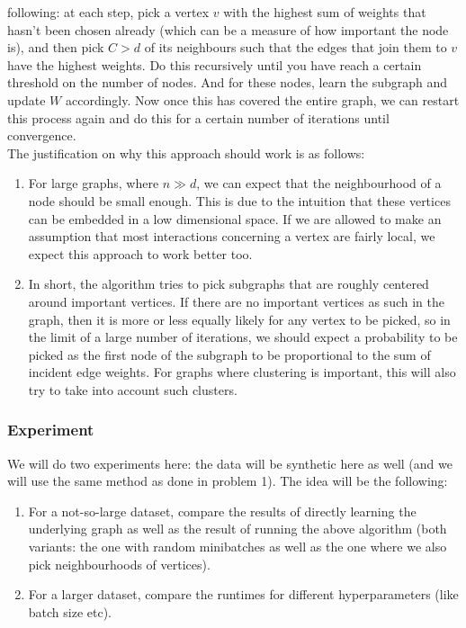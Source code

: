 \documentclass[a4paper]{article}
\newcommand{\nl}{\vspace{0.2cm}\\}
\begin{document}
following: at each step, pick a vertex $v$ with the highest sum of weights that hasn't been chosen already (which can be a measure of how important the node is), and then pick $C > d$ of its neighbours such that the edges that join
them to $v$ have the highest weights. Do this recursively until you have reach a certain threshold on the number of nodes. And for these nodes, learn the subgraph and update $W$ accordingly. Now
once this has covered the entire graph, we can restart this process again and do this for a certain number of iterations until convergence.\nl
The justification on why this approach should work is as follows:
\begin{enumerate}
    \item For large graphs, where $n \gg d$, we can expect that the neighbourhood of a node should be small enough. This is due to the intuition that these vertices can be embedded in a low
        dimensional space. If we are allowed to make an assumption that most interactions concerning a vertex are fairly local, we expect this approach to work better too.
    \item In short, the algorithm tries to pick subgraphs that are roughly centered around important vertices. If there are no important vertices as such in the graph, then it is more or less equally
        likely for any vertex to be picked, so in the limit of a large number of iterations, we should expect a probability to be picked as the first node of the subgraph to be proportional
        to the sum of incident edge weights. For graphs where clustering is important, this will also try to take into account such clusters.
\end{enumerate}

\subsubsection{Experiment}

We will do two experiments here: the data will be synthetic here as well (and we will use the same method as done in problem 1). The idea will be the following:
\begin{enumerate}
    \item For a not-so-large dataset, compare the results of directly learning the underlying graph as well as the result of running the above algorithm (both variants: the one with random
        minibatches as well as the one where we also pick neighbourhoods of vertices).
    \item For a larger dataset, compare the runtimes for different hyperparameters (like batch size etc).
\end{enumerate}
\end{document}
